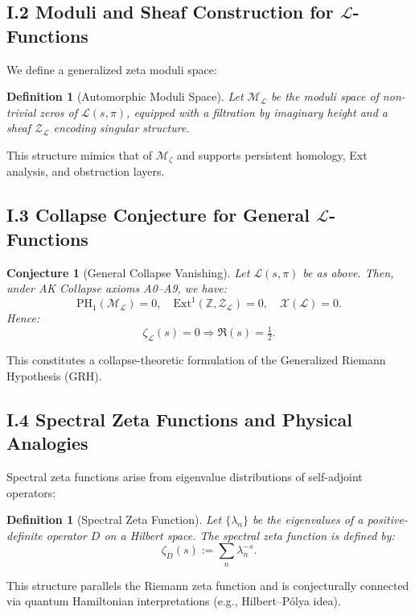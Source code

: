 \documentclass[11pt]{article}
\newtheorem{definition}[theorem]{Definition}
\newcommand{\Sha}{\mathcal{X}}
\newtheorem{conjecture}{Conjecture}[section]
\begin{document}
\subsection*{I.2 Moduli and Sheaf Construction for $\mathcal{L}$-Functions}

We define a generalized zeta moduli space:

\begin{definition}[Automorphic Moduli Space]
Let $\mathcal{M}_{\mathcal{L}}$ be the moduli space of non-trivial zeros of $\mathcal{L}(s, \pi)$,  
equipped with a filtration by imaginary height and a sheaf $\mathcal{Z}_{\mathcal{L}}$ encoding singular structure.
\end{definition}

This structure mimics that of $\mathcal{M}_\zeta$ and supports persistent homology, Ext analysis, and obstruction layers.

\subsection*{I.3 Collapse Conjecture for General $\mathcal{L}$-Functions}

\begin{conjecture}[General Collapse Vanishing]
Let $\mathcal{L}(s, \pi)$ be as above. Then, under AK Collapse axioms A0–A9, we have:
\[
\mathrm{PH}_1(\mathcal{M}_{\mathcal{L}}) = 0, \quad \mathrm{Ext}^1(\mathbb{Z}, \mathcal{Z}_{\mathcal{L}}) = 0, \quad \Sha(\mathcal{L}) = 0.
\]
Hence:
\[
\zeta_{\mathcal{L}}(s) = 0 \Rightarrow \Re(s) = \tfrac{1}{2}.
\]
\end{conjecture}

This constitutes a collapse-theoretic formulation of the Generalized Riemann Hypothesis (GRH).

\subsection*{I.4 Spectral Zeta Functions and Physical Analogies}

Spectral zeta functions arise from eigenvalue distributions of self-adjoint operators:

\begin{definition}[Spectral Zeta Function]
Let $\{\lambda_n\}$ be the eigenvalues of a positive-definite operator $D$ on a Hilbert space.  
The spectral zeta function is defined by:
\[
\zeta_D(s) := \sum_{n} \lambda_n^{-s}.
\]
\end{definition}

This structure parallels the Riemann zeta function and is conjecturally connected via quantum Hamiltonian interpretations (e.g., Hilbert–Pólya idea).
\end{document}
